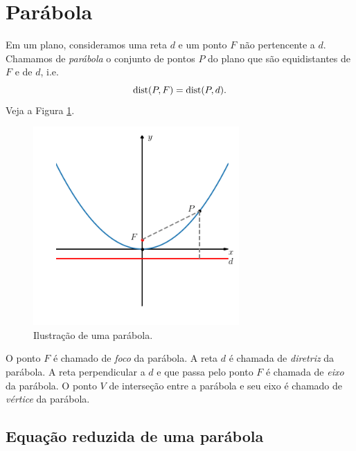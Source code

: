\emconstrucao

\section{Parábola}\label{cap_conicas_sec_parabola}

Em um plano, consideramos uma reta $d$ e um ponto $F$ não pertencente a $d$. Chamamos de \emph{parábola} o conjunto de pontos $P$ do plano que são equidistantes de $F$ e de $d$, i.e.
\begin{equation}
  \operatorname{dist}(P,F) = \operatorname{dist}(P,d).
\end{equation}
Veja a Figura \ref{fig:parabola}.

\begin{figure}[H]
  \centering
  \includegraphics[width=0.7\textwidth]{./cap_conicas/dados/fig_parabola/fig_parabola}
  \caption{Ilustração de uma parábola.}
  \label{fig:parabola}
\end{figure}

O ponto $F$ é chamado de \emph{foco} da parábola. A reta $d$ é chamada de \emph{diretriz} da parábola. A reta perpendicular a $d$ e que passa pelo ponto $F$ é chamada de \emph{eixo} da parábola. O ponto $V$ de interseção entre a parábola e seu eixo é chamado de \emph{vértice} da parábola.

\subsection{Equação reduzida de uma parábola}

